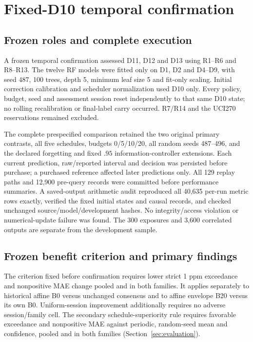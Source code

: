 \section{Fixed-D10 temporal confirmation}\label{sec:c5}
\subsection{Frozen roles and complete execution}
A frozen temporal confirmation assessed D11, D12 and D13 using R1--R6 and R8--R13. The twelve RF models were fitted only on D1, D2 and D4--D9, with seed 487, 100 trees, depth 5, minimum leaf size 5 and fit-only scaling. Initial correction calibration and scheduler normalization used D10 only. Every policy, budget, seed and assessment session reset independently to that same D10 state; no rolling recalibration or final-label carry occurred. R7/R14 and the UCI270 reservations remained excluded.

The complete prespecified comparison retained the two original primary contrasts, all five schedules, budgets 0/5/10/20, all random seeds 487--496, and the declared forgetting and fixed $.95$ information-controller extensions. Each current prediction, raw/reported interval and decision was persisted before purchase; a purchased reference affected later predictions only. All 129 replay paths and 12,900 pre-query records were committed before performance summaries. A saved-output arithmetic audit reproduced all 40,635 per-run metric rows exactly, verified the fixed initial states and causal records, and checked unchanged source/model/development hashes. No integrity/access violation or numerical-update failure was found. The 300 exposures and 3,600 correlated outputs are separate from the development sample.

\subsection{Frozen benefit criterion and primary findings}
The criterion fixed before confirmation requires lower strict 1 ppm exceedance and nonpositive MAE change pooled and in both families. It applies separately to historical affine B0 versus unchanged consensus and to affine envelope B20 versus its own B0. Uniform-session improvement additionally requires no adverse session/family cell. The secondary schedule-superiority rule requires favorable exceedance and nonpositive MAE against periodic, random-seed mean and confidence, pooled and in both families (Section~\ref{sec:evaluation}).

